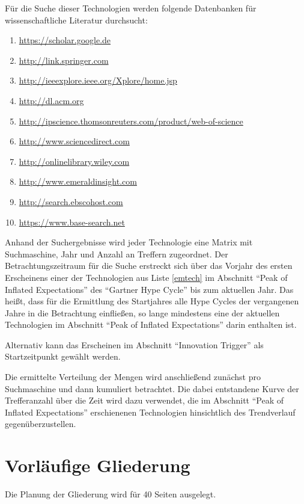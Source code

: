 Für die Suche dieser Technologien werden folgende Datenbanken für wissenschaftliche Literatur durchsucht:
\begin{enumerate}
	\item \url{https://scholar.google.de}
	\item \url{http://link.springer.com}
	\item \url{http://ieeexplore.ieee.org/Xplore/home.jsp}
	\item \url{http://dl.acm.org}
	\item \url{http://ipscience.thomsonreuters.com/product/web-of-science}
	\item \url{http://www.sciencedirect.com}
	\item \url{http://onlinelibrary.wiley.com}
	\item \url{http://www.emeraldinsight.com}
	\item \url{http://search.ebscohost.com}
	\item \url{https://www.base-search.net}
\end{enumerate}

Anhand der Suchergebnisse wird jeder Technologie eine Matrix mit Suchmaschine, Jahr und Anzahl an Treffern zugeordnet. 
Der Betrachtungszeitraum für die Suche erstreckt sich über das Vorjahr des ersten Erscheinens einer der Technologien aus Liste \ref{emtech} im Abschnitt "`Peak of Inflated Expectations"' des "`Gartner Hype Cycle"' bis zum aktuellen Jahr. Das heißt, dass für die Ermittlung des Startjahres alle Hype Cycles der vergangenen Jahre in die Betrachtung einfließen, so lange mindestens eine der aktuellen Technologien im Abschnitt "`Peak of Inflated Expectations"' darin enthalten ist.

Alternativ kann das Erscheinen im Abschnitt "`Innovation Trigger"' als Startzeitpunkt gewählt werden.

Die ermittelte Verteilung der Mengen wird anschließend zunächst pro Suchmaschine und dann kumuliert betrachtet. Die dabei entstandene Kurve der Trefferanzahl über die Zeit wird dazu verwendet, die im Abschnitt "`Peak of Inflated Expectations"' erschienenen Technologien hinsichtlich des Trendverlauf gegenüberzustellen.

\section{Vorläufige Gliederung}
Die Planung der Gliederung wird für 40 Seiten ausgelegt.

